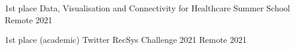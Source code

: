 



\begin{cvhonors}

  \cvhonor
    {1st place} %
    {Data, Visualisation and Connectivity for Healthcare Summer School} %
    {Remote} %
    {2021} %

  \cvhonor
    {1st place (academic)} %
    {Twitter RecSys Challenge 2021} %
    {Remote} %
    {2021} %

\end{cvhonors}






